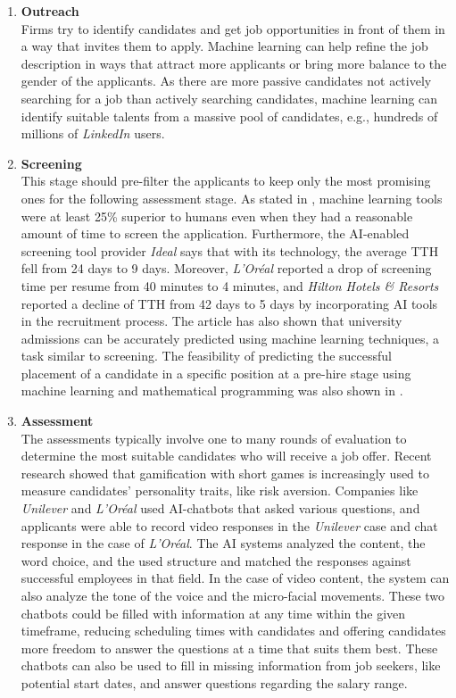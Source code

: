 \documentclass[draft,final]{thesisclass} %
\begin{document}
\begin{enumerate}
    \item \textbf{Outreach}\\
    Firms try to identify candidates and get job opportunities in front of them in a way that invites them to apply. Machine learning can help refine the job description in ways that attract more applicants or bring more balance to the gender of the applicants. As there are more passive candidates not actively searching for a job than actively searching candidates, machine learning can identify suitable talents from a massive pool of candidates, e.g., hundreds of millions of \textit{LinkedIn} users.
    \item \textbf{Screening}\\
    This stage should pre-filter the applicants to keep only the most promising ones for the following assessment stage.
    As stated in \textcite[6]{ai_recruiting}, machine learning tools were at least 25\% superior to humans even when they had a reasonable amount of time to screen the application. Furthermore, the \acs{AI}-enabled screening tool provider \textit{Ideal} says that with its technology, the average \gls{TTH} fell from 24 days to 9 days.
    Moreover, \textit{L'Oréal} reported a drop of screening time per resume from 40 minutes to 4 minutes, and \textit{Hilton Hotels \& Resorts} reported a decline of \gls{TTH} from 42 days to 5 days by incorporating \acs{AI} tools in the recruitment process. The article \textcite[7]{optimizing_university_admissions} has also shown that university admissions can be accurately predicted using machine learning techniques, a task similar to screening. The feasibility of predicting the successful placement of a candidate in a specific position at a pre-hire stage using machine learning and mathematical programming was also shown in \textcite[1]{employee_recruitment_ml_approach}.
    \item \textbf{Assessment}\\
    The assessments typically involve one to many rounds of evaluation to determine the most suitable candidates who will receive a job offer. Recent research showed that gamification with short games is increasingly used to measure candidates' personality traits, like risk aversion. Companies like \textit{Unilever} and \textit{L'Oréal} used \acs{AI}-chatbots that asked various questions, and applicants were able to record video responses in the \textit{Unilever} case and chat response in the case of \textit{L'Oréal}. The \acs{AI} systems analyzed the content, the word choice, and the used structure and matched the responses against successful employees in that field. In the case of video content, the system can also analyze the tone of the voice and the micro-facial movements. These two chatbots could be filled with information at any time within the given timeframe, reducing scheduling times with candidates and offering candidates more freedom to answer the questions at a time that suits them best. These chatbots can also be used to fill in missing information from job seekers, like potential start dates, and answer questions regarding the salary range.

\end{enumerate}
\end{document}
